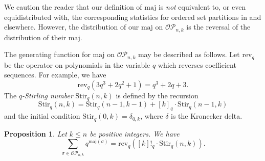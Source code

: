 \documentclass[10pt]{amsart}
\newtheorem{proposition}[theorem]{Proposition}
\theoremstyle{definition}
\newcommand{\maj}{{\mathrm {maj}}}
\newcommand{\Stir}{{\mathrm {Stir}}}
\newcommand{\rev}{{\mathrm {rev}}}
\newcommand{\OP}{{\mathcal{OP}}}
\begin{document}
We caution the reader that our definition of
$\maj$ is \emph{not} equivalent to, or even equidistributed with,
the corresponding statistics for ordered set partitions in \cite{RW, HRS} and elsewhere.  
However,
the distribution of our $\maj$ on $\OP_{n,k}$ is the reversal of the distribution of their $\maj$.


The generating function for $\maj$ on $\OP_{n,k}$ may be described as follows.  
Let $\rev_q$ be the operator on polynomials in the variable $q$ which reverses coefficient sequences.
For example, we have
\begin{equation*}
\rev_q(3q^3 + 2q^2 + 1) = q^3 + 2q + 3.
\end{equation*}
The \emph{$q$-Stirling number} $\Stir_q(n,k)$ is defined by the recursion
\begin{equation}
\Stir_q(n,k) = \Stir_q(n-1,k-1) + [k]_q \cdot \Stir_q(n-1,k)
\end{equation}
and the initial condition $\Stir_q(0,k) = \delta_{0,k}$, where $\delta$ is the Kronecker delta.

\begin{proposition}
Let $k \leq n$ be positive integers.  We have
\begin{equation}
\sum_{\sigma \in \OP_{n,k}} q^{\maj(\sigma)} = \rev_q( [k]!_q \cdot \Stir_q(n,k)).
\end{equation}
\end{proposition}
\end{document}
